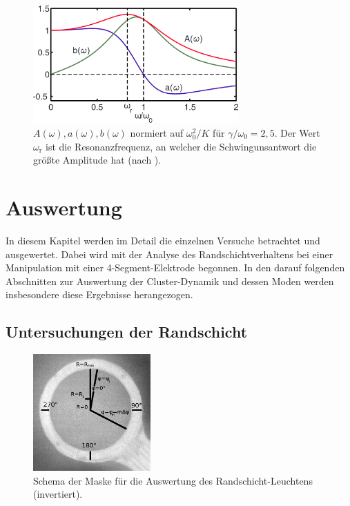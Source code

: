 \documentclass[numbers=noenddot,a4paper,notitlepage,twoside,BCOR15mm]{scrbook}
\newcommand{\ix}[1]{_\text{#1}}
\begin{document}
				\begin{figure}[H]
					\centering
					\includegraphics[width=0.7\textwidth,height=0.35\textwidth]{figs/amplitud.png}
					\caption{$A\left(\omega\right), a\left(\omega\right), b\left(\omega\right)$ normiert auf $\omega\ix{0}^2/K $ für $\gamma/\omega\ix{0}=2,5$. Der Wert $\omega\ix{r}$ ist die Resonanzfrequenz, an welcher die Schwingunsantwort die größte Amplitude hat (nach \cite{Carstensen11}).}
					\label{img:amplitud}
				\end{figure}

	\chapter{Auswertung}\label{sec:auswert}

		In diesem Kapitel werden im Detail die einzelnen Versuche betrachtet und ausgewertet. Dabei wird mit der Analyse des Randschichtverhaltens bei einer Manipulation mit einer 4-Segment-Elektrode begonnen. In den darauf folgenden Abschnitten zur Auswertung der Cluster-Dynamik und dessen Moden werden insbesondere diese Ergebnisse herangezogen.

        \section{Untersuchungen der Randschicht}\label{sub:glowanalys}

                \begin{figure}
                    \centering
                    \includegraphics[width=0.4\textwidth,height=0.4\textwidth]{figs/auswertung/plasmaglw/randanalysemaske.png}
                    \caption{Schema der Maske für die Auswertung des Randschicht-Leuchtens (invertiert).}
                    \label{img:randmaske}
                \end{figure}
\end{document}

